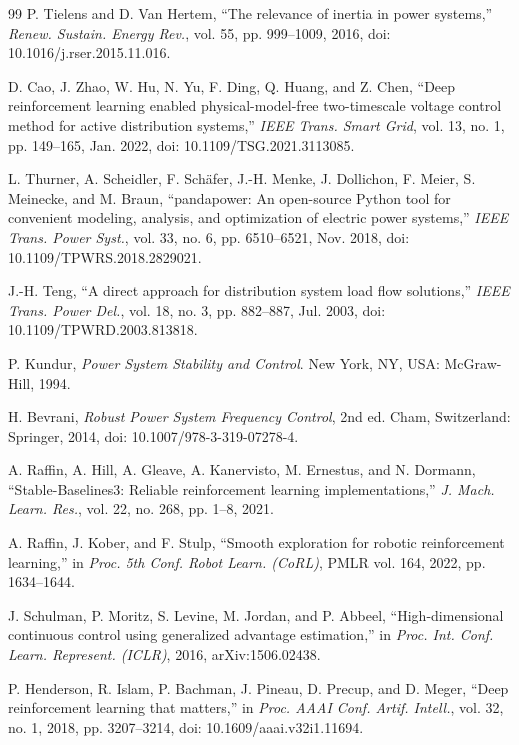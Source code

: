 \begin{thebibliography}{99}
P. Tielens and D. Van Hertem,
``The relevance of inertia in power systems,''
\emph{Renew. Sustain. Energy Rev.}, vol. 55, pp. 999--1009, 2016,
doi: 10.1016/j.rser.2015.11.016.

D. Cao, J. Zhao, W. Hu, N. Yu, F. Ding, Q. Huang, and Z. Chen,
``Deep reinforcement learning enabled physical-model-free two-timescale voltage
control method for active distribution systems,''
\emph{IEEE Trans. Smart Grid}, vol. 13, no. 1, pp. 149--165, Jan. 2022,
doi: 10.1109/TSG.2021.3113085.

L. Thurner, A. Scheidler, F. Sch\"{a}fer, J.-H. Menke, J. Dollichon, F. Meier,
S. Meinecke, and M. Braun,
``pandapower: An open-source Python tool for convenient modeling, analysis, and
optimization of electric power systems,''
\emph{IEEE Trans. Power Syst.}, vol. 33, no. 6, pp. 6510--6521, Nov. 2018,
doi: 10.1109/TPWRS.2018.2829021.

J.-H. Teng,
``A direct approach for distribution system load flow solutions,''
\emph{IEEE Trans. Power Del.}, vol. 18, no. 3, pp. 882--887, Jul. 2003,
doi: 10.1109/TPWRD.2003.813818.

P. Kundur, \emph{Power System Stability and Control}.
New York, NY, USA: McGraw-Hill, 1994.

H. Bevrani, \emph{Robust Power System Frequency Control}, 2nd ed.
Cham, Switzerland: Springer, 2014,
doi: 10.1007/978-3-319-07278-4.

A. Raffin, A. Hill, A. Gleave, A. Kanervisto, M. Ernestus, and N. Dormann,
``Stable-Baselines3: Reliable reinforcement learning implementations,''
\emph{J. Mach. Learn. Res.}, vol. 22, no. 268, pp. 1--8, 2021.

A. Raffin, J. Kober, and F. Stulp,
``Smooth exploration for robotic reinforcement learning,''
in \emph{Proc. 5th Conf. Robot Learn. (CoRL)}, PMLR vol. 164, 2022, pp. 1634--1644.

J. Schulman, P. Moritz, S. Levine, M. Jordan, and P. Abbeel,
``High-dimensional continuous control using generalized advantage estimation,''
in \emph{Proc. Int. Conf. Learn. Represent. (ICLR)}, 2016,
arXiv:1506.02438.

P. Henderson, R. Islam, P. Bachman, J. Pineau, D. Precup, and D. Meger,
``Deep reinforcement learning that matters,''
in \emph{Proc. AAAI Conf. Artif. Intell.}, vol. 32, no. 1, 2018,
pp. 3207--3214, doi: 10.1609/aaai.v32i1.11694.


\end{thebibliography}
